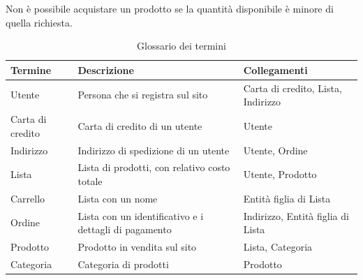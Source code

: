 \documentclass[11pt]{article}
\begin{document}
Non è possibile acquistare un prodotto se la quantità disponibile è minore di
quella richiesta. 

\begin{table}[H]
	\centering
	\begin{tabularx}{\textwidth}{|l|X|l|}
		\hline
		\textbf{Termine} & \textbf{Descrizione} & \textbf{Collegamenti} \\
		\hline
		Utente & Persona che si registra sul sito & Carta di credito,
		Lista, Indirizzo \\
		\hline
		Carta di credito & Carta di credito di un utente & Utente \\
		\hline
		Indirizzo & Indirizzo di spedizione di un utente & Utente,
		Ordine \\
		\hline
		Lista & Lista di prodotti, con relativo costo totale & Utente,
		Prodotto \\
		\hline
		Carrello & Lista con un nome & Entità figlia di Lista \\
		\hline
		Ordine & Lista con un identificativo e i dettagli di pagamento
		& Indirizzo, Entità figlia di Lista \\
		\hline
		Prodotto & Prodotto in vendita sul sito & Lista, Categoria \\
		\hline
		Categoria & Categoria di prodotti & Prodotto \\
		\hline
	\end{tabularx}
	\caption{Glossario dei termini}
\end{table}
\end{document}
